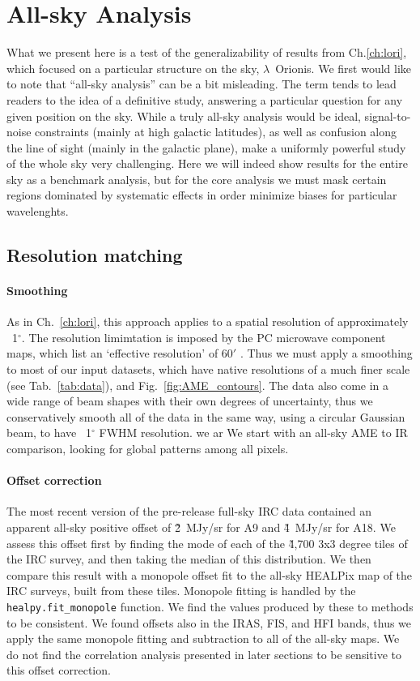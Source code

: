 \chapter{All-sky Analysis}
  \label{sec:analysis}
    What we present here is a test of the generalizability of results from Ch.\ref{ch:lori}, which focused on a particular structure on the sky, $\lambda$~Orionis.
    We first would like to note that ``all-sky analysis'' can be a bit misleading. The term tends to lead readers to the idea of a definitive study, answering a particular question for any given position on the sky.  While a truly all-sky analysis would be ideal, signal-to-noise constraints (mainly at high galactic latitudes), as well as confusion along the line of sight (mainly in the galactic plane), make a uniformly powerful study of the whole sky very challenging. Here we will indeed show results for the entire sky as a benchmark analysis, but for the core analysis we must mask certain regions dominated by systematic effects in order minimize biases for particular wavelenghts.

\section{Resolution matching}
    \subsubsection{Smoothing}
        As in Ch.~\ref{ch:lori}, this approach applies to a spatial resolution of approximately ~1$^{\circ}$. The resolution limimtation is imposed by the PC microwave component maps, which list an `effective resolution' of 60$'$ \citep{planck15X}. Thus we must apply a smoothing to most of our input datasets, which have native resolutions of a much finer scale (see Tab.~\ref{tab:data}), and Fig.~\ref{fig:AME_contours}. The data also come in a wide range of beam shapes with their own degrees of uncertainty, thus we conservatively smooth all of the data in the same way, using a circular Gaussian beam, to have ~1$^{\circ}$ FWHM resolution. we ar We start with an all-sky AME to IR comparison, looking for global patterns among all pixels.

    \subsubsection{Offset correction}
      The most recent version of the pre-release full-sky IRC data contained an apparent all-sky positive offset of \~2~MJy/sr for A9 and \~4~MJy/sr for A18. We assess this offset first by finding the mode of each of the \~4,700 3x3 degree tiles of the IRC survey, and then taking the median of this distribution. We then compare this result with a monopole offset fit to the all-sky HEALPix map of the IRC surveys, built from these tiles. Monopole fitting is handled by the {\tt healpy.fit\_monopole} function. We find the values produced by these to methods to be consistent. We found offsets also in the IRAS, FIS, and HFI bands, thus we apply the same monopole fitting and subtraction to all of the all-sky maps. We do not find the correlation analysis presented in later sections to be sensitive to this offset correction.

